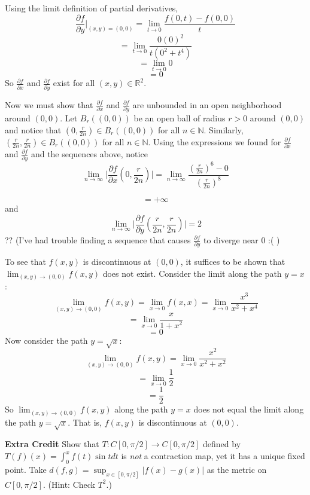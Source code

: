 \documentclass{article}
\begin{document}
\begin{enumerate}
\begin{enumerate}
        Using the limit definition of partial derivatives,
        \[\frac{\partial f}{\partial y} \bigg|_{(x,y) = (0,0)} = \lim_{t \to 0} \frac{f(0, t) - f(0,0)}{t}\]
        \[ = \lim_{t \to 0} \frac{0(0)^2}{t(0^2 + t^4)}\]
        \[ = \lim_{t \to 0} 0\]
        \[ = 0\]
        So $\frac{\partial f}{\partial x}$ and $\frac{\partial f}{\partial y}$ exist for all $(x,y) \in \mathbb{R}^2$. 
        \newline
        
        Now we must show that $\frac{\partial f}{\partial x}$ and $\frac{\partial f}{\partial y}$ are unbounded in an open neighborhood around $(0,0)$. Let $B_r((0,0))$ be an open ball of radius $r > 0$ around $(0,0)$ and notice that $\left(0, \frac{r}{2n}\right) \in B_r((0,0))$ for all $n \in \mathbb{N}$. Similarly, $\left(\frac{r}{2n}, \frac{r}{2n}\right) \in B_r((0,0))$ for all $n \in \mathbb{N}$.
        Using the expressions we found for $\frac{\partial f}{\partial x}$ and $\frac{\partial f}{\partial y}$ and the sequences above, notice
        \[\lim_{n \to \infty} \bigg| \frac{\partial f}{\partial x}\left(0,\frac{r}{2n}\right)\bigg| = \lim_{n \to \infty} \frac{\left(\frac{r}{2n}\right)^6 - 0}{\left(\frac{r}{2n}\right)^8}\]
        
        \[ = + \infty\]
        and
        \[\lim_{n \to \infty} \bigg| \frac{\partial f}{\partial y}\left(\frac{r}{2n}, \frac{r}{2n}\right)\bigg| = 2\]??
        (I've had trouble finding a sequence that causes $\frac{\partial f}{\partial y}$ to diverge near 0 :( )
        
        To see that $f(x,y)$ is discontinuous at $(0,0)$, it suffices to be shown that $\lim_{(x,y) \to (0,0)} f(x,y)$ does not exist. Consider the limit along the path $y = x$:
        \[\lim_{(x,y) \to (0,0)} f(x,y) = \lim_{x \to 0} f(x,x) = \lim_{x \to 0} \frac{x^3}{x^2 + x^4}\]
        \[ = \lim_{x \to 0} \frac{x}{1 + x^2}\]
        \[ = 0\]
        Now consider the path $y = \sqrt{x}$:
        \[\lim_{(x,y) \to (0,0)} f(x,y) = \lim_{x \to 0} \frac{x^2}{x^2 + x^2}\]
        \[ = \lim_{x \to 0} \frac{1}{2}\]
        \[ = \frac{1}{2}\]
        So $\lim_{(x,y) \to (0,0)} f(x,y)$ along the path $y = x$ does not equal the limit along the path $y = \sqrt{x}$. That is, $f(x,y)$ is discontinuous at $(0,0)$.
    \end{enumerate}
\end{enumerate}

\textbf{Extra Credit} Show that $T: C[0,\pi / 2] \to C[0, \pi / 2]$ defined by $T(f)(x) = \int_0^x f(t) \sin{t}dt$ is \textit{not} a contraction map, yet it has a unique fixed point. Take $d(f,g) = \sup_{x \in [0, \pi/2]} |f(x) - g(x)|$ as the metric on $C[0, \pi / 2]$. (Hint: Check $T^2$.)
\end{document}
